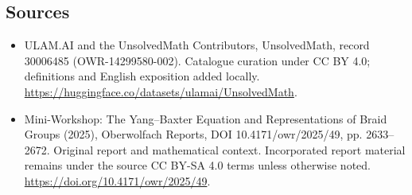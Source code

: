 \documentclass[11pt]{article}
\begin{document}
\subsection{Sources}
\begin{itemize}
\item[\hypertarget{source:30006485:1}{S1}] ULAM.AI and the UnsolvedMath Contributors, UnsolvedMath, record 30006485 (OWR-14299580-002). Catalogue curation under CC BY 4.0; definitions and English exposition added locally.
\url{https://huggingface.co/datasets/ulamai/UnsolvedMath}.
\item[\hypertarget{source:30006485:2}{S2}] Mini-Workshop: The Yang–Baxter Equation and Representations of Braid Groups (2025), Oberwolfach Reports, DOI 10.4171/owr/2025/49, pp. 2633--2672. Original report and mathematical context. Incorporated report material remains under the source CC BY-SA 4.0 terms unless otherwise noted.
\url{https://doi.org/10.4171/owr/2025/49}.
\end{itemize}
\label{end:30006485}
\end{document}
